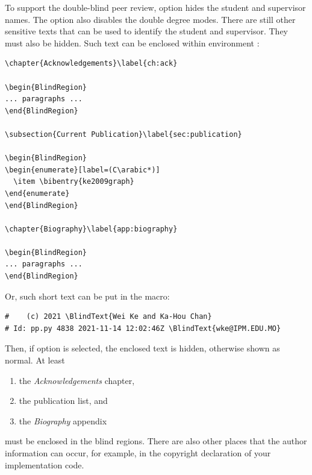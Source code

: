 To support the double-blind peer review, option  hides the student and supervisor names.
The option also disables the double degree modes.
There are still other sensitive texts that can be used to identify the student and supervisor.
They must also be hidden.
Such text can be enclosed within environment :
\begin{verbatim}
\chapter{Acknowledgements}\label{ch:ack}

\begin{BlindRegion}
... paragraphs ...
\end{BlindRegion}

\subsection{Current Publication}\label{sec:publication}

\begin{BlindRegion}
\begin{enumerate}[label=(C\arabic*)]
  \item \bibentry{ke2009graph}
\end{enumerate}
\end{BlindRegion}

\chapter{Biography}\label{app:biography}

\begin{BlindRegion}
... paragraphs ...
\end{BlindRegion}
\end{verbatim}
Or, such short text can be put in the  macro:
\begin{verbatim}
#    (c) 2021 \BlindText{Wei Ke and Ka-Hou Chan}
# Id: pp.py 4838 2021-11-14 12:02:46Z \BlindText{wke@IPM.EDU.MO}
\end{verbatim}
Then, if option  is selected, the enclosed text is hidden, otherwise shown as normal.
At least
\begin{enumerate}
\item the {\em Acknowledgements} chapter,
\item the publication list, and
\item the {\em Biography} appendix
\end{enumerate}
must be enclosed in the blind regions.
There are also other places that the author information can occur,
for example, in the copyright declaration of your implementation code.

